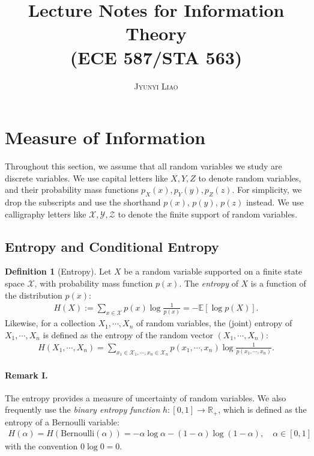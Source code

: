 \documentclass{article}
\title{\bf Lecture Notes for Information Theory \\(ECE 587/STA 563)}
\author{\textsc{Jyunyi Liao}}
\date{}
\numberwithin{equation}{section}
\newcommand{\E}{\mathbb{E}}
\newcommand{\bbR}{\mathbb{R}}
\theoremstyle{plain}
\theoremstyle{definition}
\newtheorem{definition}[theorem]{Definition}
\begin{document}
\maketitle
\tableofcontents

\newpage
\section{Measure of Information}
Throughout this section, we assume that all random variables we study are discrete variables. We use capital letters like $X,Y,Z$ to denote random variables, and their probability mass functions $p_X(x),p_Y(y),p_Z(z)$. For simplicity, we drop the subscripts and use the shorthand $p(x)$, $p(y)$, $p(z)$ instead. We use calligraphy letters like $\mathcal{X},\mathcal{Y},\mathcal{Z}$ to denote the finite support of random variables. 
\subsection{Entropy and Conditional Entropy}
\begin{definition}[Entropy]\label{entropydef}
Let $X$ be a random variable supported on a finite state space $\mathcal{X}$, with probability mass function $p(x)$. The \textit{entropy} of $X$ is a function of the distribution $p(x)$:
\begin{align*}
	H(X):=\sum_{x\in\mathcal{X}}p(x)\log\frac{1}{p(x)}=-\E\left[\log p(X)\right].
\end{align*}
Likewise, for a collection $X_1,\cdots,X_n$ of random variables, the (joint) entropy of $X_1,\cdots,X_n$ is defined as the entropy of the random vector $(X_1,\cdots,X_n)$:
\begin{align*}
	H(X_1,\cdots,X_n)=\sum_{x_1\in\mathcal{X}_1,\cdots,x_n\in\mathcal{X}_n}p(x_1,\cdots,x_n)\log\frac{1}{p(x_1,\cdots,x_n)}.
\end{align*}
\end{definition}
\paragraph{Remark I.} The entropy provides a measure of uncertainty of random variables. We also frequently use the \textit{binary entropy function} $h:[0,1]\to\bbR_+$, which is defined as the entropy of a Bernoulli variable:
\begin{align*}
	H(\alpha)=H(\mathrm{Bernoulli}(\alpha))=-\alpha\log \alpha-(1-\alpha)\log(1-\alpha),\quad \alpha\in[0,1]
\end{align*}
with the convention $0\log 0=0$.
\end{document}
